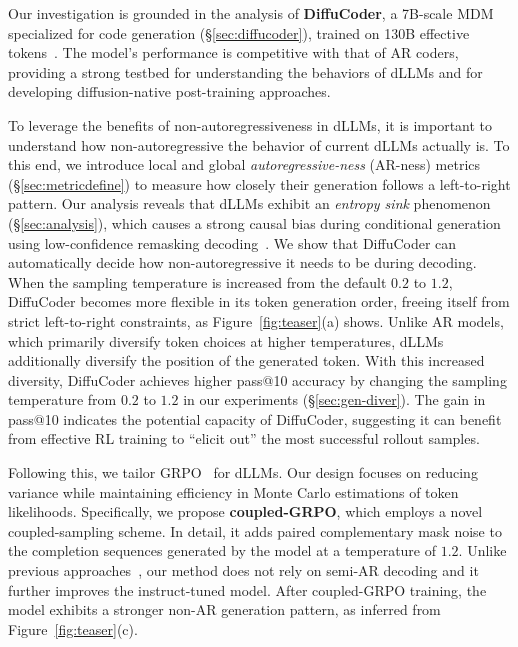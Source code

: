 Our investigation is grounded in the analysis of \textbf{DiffuCoder}, a 7B-scale MDM specialized for code generation (\S\ref{sec:diffucoder}), trained on 130B effective tokens~\citep{huang2024opencoder}. The model's performance is competitive with that of AR coders, providing a strong testbed for understanding the behaviors of dLLMs and for developing diffusion-native post-training approaches.

To leverage the benefits of non-autoregressiveness in dLLMs, it is important to understand how non-autoregressive the behavior of current dLLMs actually is. To this end, we introduce local and global \emph{autoregressive-ness} (AR-ness) metrics (\S\ref{sec:metricdefine}) to measure how closely their generation follows a left-to-right pattern. 
Our analysis reveals that dLLMs exhibit an \emph{entropy sink} phenomenon (\S\ref{sec:analysis}), which causes a strong causal bias during conditional generation using low-confidence remasking decoding~\citep{maskgit}. We show that DiffuCoder can automatically decide how non-autoregressive it needs to be during decoding. When the sampling temperature is increased from the default $0.2$ to $1.2$, DiffuCoder becomes more flexible in its token generation order, freeing itself from strict left-to-right constraints, as Figure~\ref{fig:teaser}(a) shows. 
Unlike AR models, which primarily diversify token choices at higher temperatures, dLLMs additionally diversify the position of the generated token. 
With this increased diversity, DiffuCoder achieves higher pass@10 accuracy by changing the sampling temperature from $0.2$ to $1.2$ in our experiments (\S\ref{sec:gen-diver}). 
The gain in pass@10 indicates the potential capacity of DiffuCoder, suggesting it can benefit from effective RL training to ``elicit out'' the most successful rollout samples.

Following this, we tailor GRPO~\citep{shao2024deepseekmath} for dLLMs. Our design focuses on reducing variance while maintaining efficiency in Monte Carlo estimations of token likelihoods. Specifically, we propose \textbf{coupled-GRPO}, which employs a novel coupled-sampling scheme. In detail, it adds paired complementary mask noise to the completion sequences generated by the model at a temperature of $1.2$. Unlike previous approaches~\citep{zhao2025d1}, our method does not rely on semi-AR decoding and it further improves the instruct-tuned model. After coupled-GRPO training, the model exhibits a stronger non-AR generation pattern, as inferred from Figure~\ref{fig:teaser}(c).

